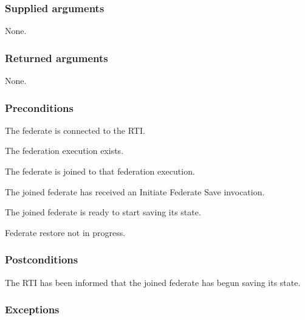 \subsubsection{Supplied arguments}

\begin{stdalphalist}
    \item None.
\end{stdalphalist}

\subsubsection{Returned arguments}

\begin{stdalphalist}
    \item None.
\end{stdalphalist}

\subsubsection{Preconditions}

\begin{stdalphalist}
    \item The federate is connected to the RTI.
    \item The federation execution exists.
    \item The federate is joined to that federation execution.
    \item The joined federate has received an Initiate Federate Save \rtiinitiated{} invocation.
    \item The joined federate is ready to start saving its state.
    \item Federate restore not in progress.
\end{stdalphalist}

\subsubsection{Postconditions}

\begin{stdalphalist}
    \item The RTI has been informed that the joined federate has begun saving its state.
\end{stdalphalist}

\subsubsection{Exceptions}

